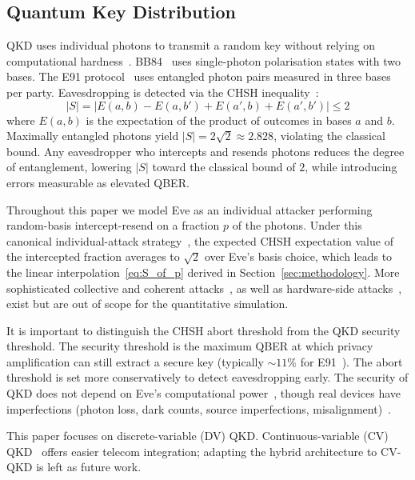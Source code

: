 \documentclass[conference]{IEEEtran}
\begin{document}
\subsection{Quantum Key Distribution}
QKD uses individual photons to transmit a random key without relying on computational hardness~\cite{gisin2002}. BB84~\cite{bennett1984} uses single-photon polarisation states with two bases. The E91 protocol~\cite{ekert1991} uses entangled photon pairs measured in three bases per party. Eavesdropping is detected via the CHSH inequality~\cite{chsh1969}:
\begin{equation}
|S| = |E(a,b) - E(a,b') + E(a',b) + E(a',b')| \leq 2 \label{eq:chsh}
\end{equation}
where $E(a,b)$ is the expectation of the product of outcomes in bases $a$ and $b$. Maximally entangled photons yield $|S| = 2\sqrt{2} \approx 2.828$, violating the classical bound. Any eavesdropper who intercepts and resends photons reduces the degree of entanglement, lowering $|S|$ toward the classical bound of $2$, while introducing errors measurable as elevated QBER.

Throughout this paper we model Eve as an individual attacker performing random-basis intercept-resend on a fraction $p$ of the photons. Under this canonical individual-attack strategy~\cite{fuchs1997}, the expected CHSH expectation value of the intercepted fraction averages to $\sqrt{2}$ over Eve's basis choice, which leads to the linear interpolation~\eqref{eq:S_of_p} derived in Section~\ref{sec:methodology}. More sophisticated collective and coherent attacks~\cite{scarani2009}, as well as hardware-side attacks~\cite{lydersen2010,makarov2009}, exist but are out of scope for the quantitative simulation.

It is important to distinguish the CHSH abort threshold from the QKD security threshold. The security threshold is the maximum QBER at which privacy amplification can still extract a secure key (typically $\sim 11\%$ for E91~\cite{scarani2009}). The abort threshold is set more conservatively to detect eavesdropping early. The security of QKD does not depend on Eve's computational power~\cite{scarani2009}, though real devices have imperfections (photon loss, dark counts, source imperfections, misalignment)~\cite{scarani2009,xu2020,treiber2009}.

This paper focuses on discrete-variable (DV) QKD. Continuous-variable (CV) QKD~\cite{pirandola2020} offers easier telecom integration; adapting the hybrid architecture to CV-QKD is left as future work.
\end{document}
